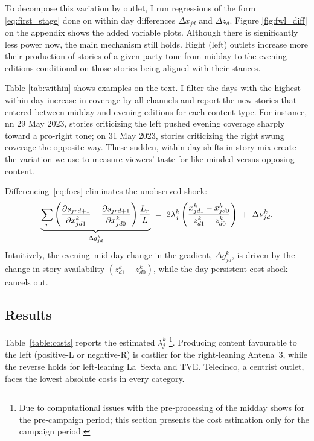 \documentclass[12pt]{article}
\begin{document}
To decompose this variation by outlet, I run regressions of the form \ref{eq:first_stage} done on within day differences $ \Delta x_{jd}$ and $\Delta z_{d}$. Figure \ref{fig:fwl_diff} on the appendix shows the added variable plots. Although there is significantly less power now, the main mechanism still holds. Right (left) outlets increase more their production of stories of a given party-tone from midday to the evening editions conditional on those stories being aligned with their stances. 



 Table \ref{tab:within} shows examples on the text. I filter the days with the highest within-day increase in coverage by all channels and report the new stories that entered between midday and evening editions for each content type. For instance, nn 29 May 2023, stories criticizing the left pushed evening coverage sharply toward a pro-right tone; on 31 May 2023, stories criticizing the right swung coverage the opposite way. These sudden, within-day shifts in story mix create the variation we use to measure viewers’ taste for like-minded versus opposing content.










Differencing~\eqref{eq:focs} eliminates the unobserved shock:
\begin{equation}\label{eq:diff_foc}
	\underbrace{%
		\sum_{r}\left(
		\frac{\partial s_{jrd+1}}{\partial x_{jd1}^k}
		-
		\frac{\partial s_{jrd+1}}{\partial x_{jd0}^k}
		\right)\frac{L_r}{L}
	}_{\Delta g_{jd}^k}
	\;=\;
	2\lambda_j^k
	\left(
	\frac{x_{jd1}^k-x_{jd0}^k}{\,z_{d1}^k-z_{d0}^k}
	\right)
	\;+\;
	\Delta\nu_{jd}^k.
\end{equation}
Intuitively, the evening–mid-day change in the gradient, $\Delta g_{jd}^k$, is driven by the change in story availability $(z_{d1}^k-z_{d0}^k)$, while the day-persistent cost shock cancels out.



\subsection{Results}





Table~\ref{table:costs} reports the estimated $\lambda_j^k$ \footnote{Due to computational issues with the pre-processing of the midday shows for the pre-campaign period; this section presents the cost estimation only for the campaign period. }.  
Producing content favourable to the left (positive-L or negative-R)
is costlier for the right-leaning Antena~3,
while the reverse holds for left-leaning La~Sexta and TVE.  
Telecinco, a centrist outlet, faces the lowest absolute costs in every category.
\end{document}
